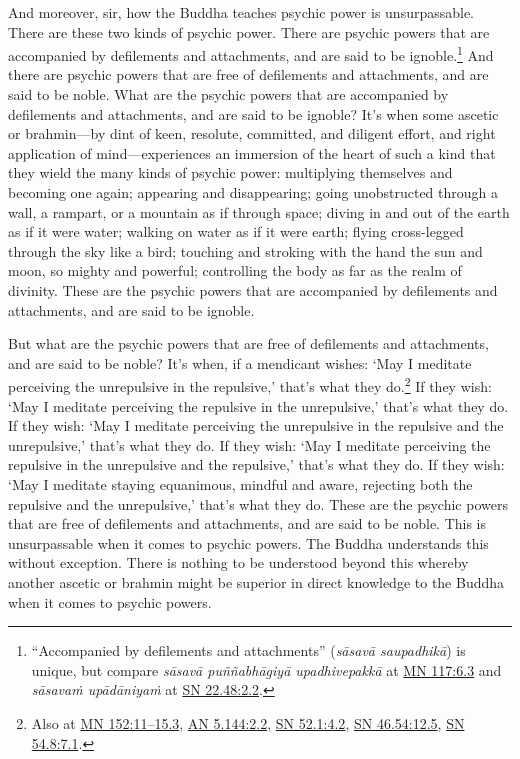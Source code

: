 \documentclass[12pt,openany]{book}%
\begin{document}
And moreover, sir, how the Buddha teaches psychic power is unsurpassable. There are these two kinds of psychic power. There are psychic powers that are accompanied by defilements and attachments, and are said to be ignoble.\footnote{“Accompanied by defilements and attachments” (\textit{\textsanskrit{sāsavā} \textsanskrit{saupadhikā}}) is unique, but compare \textit{\textsanskrit{sāsavā} \textsanskrit{puññabhāgiyā} \textsanskrit{upadhivepakkā}} at \href{https://suttacentral.net/mn117/en/sujato\#6.3}{MN 117:6.3} and \textit{\textsanskrit{sāsavaṁ} \textsanskrit{upādāniyaṁ}} at \href{https://suttacentral.net/sn22.48/en/sujato\#2.2}{SN 22.48:2.2}. } And there are psychic powers that are free of defilements and attachments, and are said to be noble. What are the psychic powers that are accompanied by defilements and attachments, and are said to be ignoble? It’s when some ascetic or brahmin—by dint of keen, resolute, committed, and diligent effort, and right application of mind—experiences an immersion of the heart of such a kind that they wield the many kinds of psychic power: multiplying themselves and becoming one again; appearing and disappearing; going unobstructed through a wall, a rampart, or a mountain as if through space; diving in and out of the earth as if it were water; walking on water as if it were earth; flying cross-legged through the sky like a bird; touching and stroking with the hand the sun and moon, so mighty and powerful; controlling the body as far as the realm of divinity. These are the psychic powers that are accompanied by defilements and attachments, and are said to be ignoble. 

But what are the psychic powers that are free of defilements and attachments, and are said to be noble? It’s when, if a mendicant wishes: ‘May I meditate perceiving the unrepulsive in the repulsive,’ that’s what they do.\footnote{Also at \href{https://suttacentral.net/mn152/en/sujato\#11-15.3}{MN 152:11–15.3}, \href{https://suttacentral.net/an5.144/en/sujato\#2.2}{AN 5.144:2.2}, \href{https://suttacentral.net/sn52.1/en/sujato\#4.2}{SN 52.1:4.2}, \href{https://suttacentral.net/sn46.54/en/sujato\#12.5}{SN 46.54:12.5}, \href{https://suttacentral.net/sn54.8/en/sujato\#7.1}{SN 54.8:7.1}. } If they wish: ‘May I meditate perceiving the repulsive in the unrepulsive,’ that’s what they do. If they wish: ‘May I meditate perceiving the unrepulsive in the repulsive and the unrepulsive,’ that’s what they do. If they wish: ‘May I meditate perceiving the repulsive in the unrepulsive and the repulsive,’ that’s what they do. If they wish: ‘May I meditate staying equanimous, mindful and aware, rejecting both the repulsive and the unrepulsive,’ that’s what they do. These are the psychic powers that are free of defilements and attachments, and are said to be noble. This is unsurpassable when it comes to psychic powers. The Buddha understands this without exception. There is nothing to be understood beyond this whereby another ascetic or brahmin might be superior in direct knowledge to the Buddha when it comes to psychic powers. 
\end{document}
